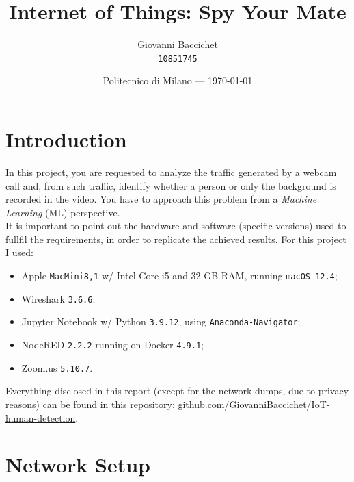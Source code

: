 \documentclass{article}
\title{Internet of Things: Spy Your Mate} %
\author{Giovanni Baccichet\\ \raisebox{0.1\height}{\fontsize{8}{8}\faUser} \texttt{10851745}} %
\date{Politecnico di Milano --- \today} %
\begin{document}
\maketitle %


\section{Introduction} %

In this project, you are requested to analyze the traffic generated by a webcam call and, from such traffic, identify whether a person or only the background is recorded in the video. You have to approach this problem from a \textit{Machine Learning} (ML) perspective. \\ It is important to point out the hardware and software (specific versions) used to fullfil the requirements, in order to replicate the achieved results. For this project I used:
\begin{itemize}
	\item Apple \texttt{MacMini8,1} w/ Intel Core i5 and 32 GB RAM, running \texttt{macOS 12.4};
	\item Wireshark \texttt{3.6.6};
	\item Jupyter Notebook w/ Python \texttt{3.9.12}, using \texttt{Anaconda-Navigator};
	\item NodeRED \texttt{2.2.2} running on Docker \texttt{4.9.1};
	\item Zoom.us \texttt{5.10.7}.
\end{itemize}
Everything disclosed in this report (except for the network dumps, due to privacy reasons) can be found in this repository: \href{https://github.com/GiovanniBaccichet/IoT-human-detection}{\raisebox{0.1\height}{\fontsize{8}{8}\faLink} github.com/GiovanniBaccichet/IoT-human-detection}.



\section{Network Setup}
\end{document}
